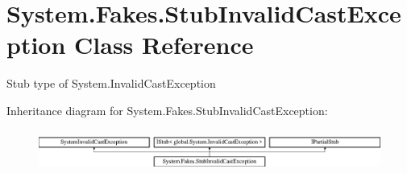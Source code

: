 \hypertarget{class_system_1_1_fakes_1_1_stub_invalid_cast_exception}{\section{System.\-Fakes.\-Stub\-Invalid\-Cast\-Exception Class Reference}
\label{class_system_1_1_fakes_1_1_stub_invalid_cast_exception}
}


Stub type of System.\-Invalid\-Cast\-Exception 


Inheritance diagram for System.\-Fakes.\-Stub\-Invalid\-Cast\-Exception\-:\begin{figure}[H]
\begin{center}
\leavevmode
\includegraphics[height=1.377614cm]{class_system_1_1_fakes_1_1_stub_invalid_cast_exception}
\end{center}
\end{figure}

